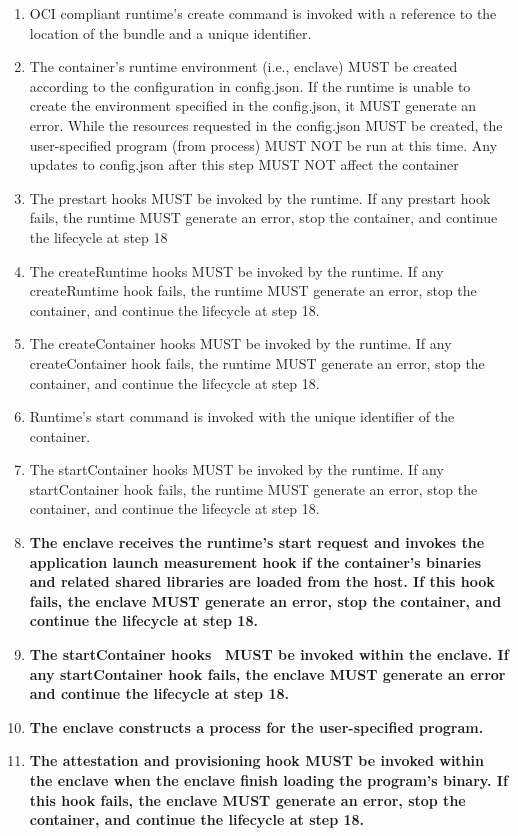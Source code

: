 \begin{enumerate}
    \item OCI compliant runtime's create command is invoked with a reference to the location of the bundle and a unique identifier.
    \item The container's runtime environment (i.e., enclave) MUST be created according to the configuration in config.json. If the runtime is unable to create the environment specified in the config.json, it MUST generate an error. While the resources requested in the config.json MUST be created, the user-specified program (from process) MUST NOT be run at 
            this time. Any updates to config.json after this step MUST NOT affect the container
    \item The prestart hooks MUST be invoked by the runtime. If any prestart hook fails, the runtime MUST generate an error, stop the container, and continue the lifecycle at step 18
    \item The createRuntime hooks MUST be invoked by the runtime. If any createRuntime hook fails, the runtime MUST generate an error, stop the container, and continue the lifecycle at step 18.
    \item The createContainer hooks MUST be invoked by the runtime. If any createContainer hook fails, the runtime MUST generate an error, stop the container, and continue the lifecycle at step 18.
    \item Runtime's start command is invoked with the unique identifier of the container.
    \item The startContainer hooks MUST be invoked by the runtime. If any startContainer hook fails, the runtime MUST generate an error, stop the container, and continue the lifecycle at step 18.
    \item \textbf{The enclave receives the runtime’s start request and invokes the application launch measurement hook if the container's binaries and related shared libraries are loaded from the host. If this hook fails, the enclave MUST generate an error, stop the container, and continue the lifecycle at step 18.}
    \item \textbf{The startContainer hooks~\cite*{start_container_hooks} MUST be invoked within the enclave.  If any startContainer hook fails, the enclave MUST generate an error and continue the lifecycle at step 18.}
    \item \textbf{The enclave constructs a process for the user-specified program.}
    \item \textbf{The attestation and provisioning hook MUST be invoked within the enclave when the enclave finish loading the program’s binary. If this hook fails, the enclave MUST generate an error, stop the container, and continue the lifecycle at step 18.}

\end{enumerate}
